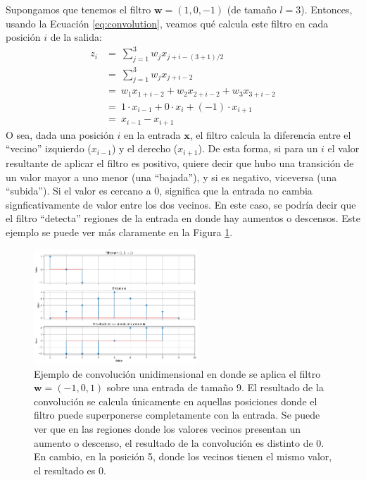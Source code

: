 \documentclass[../../main.tex]{subfiles}
\begin{document}
Supongamos que tenemos el filtro \(\bm{w} = (1, 0, -1)\) (de tamaño \(l=3\)). Entonces,
usando la Ecuación \ref{eq:convolution}, veamos qué calcula este filtro en cada
posición \(i\) de la salida:
\begin{align*}
    z_i &=\ \sum_{j=1}^3 w_j x_{j+i-(3+1)/2} \\
        &=\ \sum_{j=1}^3 w_j x_{j+i-2} \\
        &=\ w_1 x_{1+i-2} + w_2 x_{2+i-2} + w_3 x_{3+i-2} \\
        &=\ 1 \cdot x_{i-1} + 0 \cdot x_i + (-1) \cdot x_{i+1} \\
        &=\ x_{i-1} - x_{i+1}
\end{align*}
O sea, dada una posición \(i\) en la entrada \(\bm{x}\), el filtro calcula la diferencia
entre el ``vecino'' izquierdo (\(x_{i-1}\)) y el derecho (\(x_{i+1}\)). De esta forma, si
para un \(i\) el valor resultante de aplicar el filtro es positivo, quiere decir que hubo
una transición de un valor mayor a uno menor (una ``bajada''), y si es negativo, viceversa
(una ``subida''). Si el valor es cercano a 0, significa que la entrada no cambia
signficativamente de valor entre los dos vecinos. En este caso, se podría decir que el
filtro ``detecta'' regiones de la entrada en donde hay aumentos o descensos. Este ejemplo
se puede ver más claramente en la Figura \ref{fig:conv-example}.

\begin{figure}
    \centering
    \includegraphics[width=0.55\textwidth]{figs/ejemplo_convolucion.png}
    \caption{Ejemplo de convolución unidimensional en donde se aplica el filtro \(\bm{w} =
    (-1,0,1)\) sobre una entrada de tamaño 9. El resultado de la convolución se calcula
    únicamente en aquellas posiciones donde el filtro puede superponerse completamente con
    la entrada. Se puede ver que en las regiones donde los valores vecinos presentan un
    aumento o descenso, el resultado de la convolución es distinto de 0. En cambio, en
    la posición 5, donde los vecinos tienen el mismo valor, el resultado es 0.}
    \label{fig:conv-example}
\end{figure}
\end{document}
